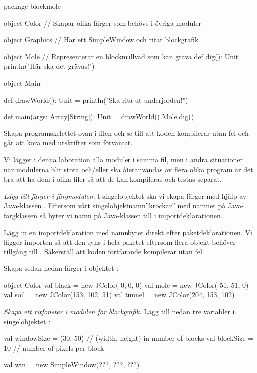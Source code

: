 \begin{Code}
package blockmole

object Color {
  // Skapar olika färger som behövs i övriga moduler
}

object Graphics {
  // Har ett SimpleWindow och ritar blockgrafik
}

object Mole { // Representerar en blockmullvad som kan gräva
  def dig(): Unit = println("Här ska det grävas!")
}

object Main {
  def drawWorld(): Unit = println("Ska rita ut underjorden!")

  def main(args: Array[String]): Unit = {
    drawWorld()
    Mole.dig()
  }
}
\end{Code}

\noindent Skapa programskelettet ovan i filen  och se till att koden kompilerar utan fel och går att köra med utskrifter som förväntat.

Vi lägger i denna laboration alla moduler i samma fil, men i andra situationer när  modulerna blir stora och/eller ska återanvändas av flera olika program är det bra att ha dem i olika filer så att de kan kompileras och testas separat.


\Task \emph{Lägg till färger i färgmodulen.} I singelobjektet  ska vi skapa färger med hjälp av Java-klassen . Eftersom vårt singelobjektnamn''krockar'' med namnet på Java-färgklassen så byter vi namn på Java-klassen till  i importdeklarationen.

Lägg in en importdeklaration med namnbytet direkt efter paketdeklarationen. Vi lägger importen så att den syns i hela paketet eftersom flera objekt behöver tillgång till . Säkerställ att koden fortfarande kompilerar utan fel.

Skapa sedan nedan färger i objektet :
\begin{Code}
object Color {
  val black  = new JColor(  0,   0,   0)
  val mole   = new JColor( 51,  51,   0)
  val soil   = new JColor(153, 102,  51)
  val tunnel = new JColor(204, 153, 102)
}
\end{Code}


\Task \emph{Skapa ett ritfönster i modulen för blockgrafik.} Lägg till nedan tre variabler i singelobjektet :

\begin{Code}
  val windowSize = (30, 50)  // (width, height) in number of blocks
  val blockSize  = 10        // number of pixels per block

  val win = new SimpleWindow(???, ???, ???)
\end{Code}

